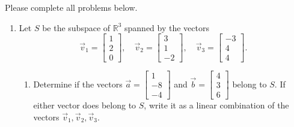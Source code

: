 \documentclass[12pt]{article}
\newcommand{\R}{\mathbb{R}}
\newcommand{\bbm}{\begin{bmatrix}}
\newcommand{\ebm}{\end{bmatrix}}
\begin{document}
\thispagestyle{fancy}
Please complete all problems below.
 \begin{enumerate}
  \item Let $S$ be the subspace of $\R^3$ spanned by the vectors
\[
 \vec{v}_1 = \bbm 1\\2\\0\ebm, \quad \vec{v}_2 = \bbm 3\\1\\-2\ebm, \quad \vec{v}_3 = \bbm -3\\4\\4\ebm.
\]
\begin{enumerate}
 \item Determine if the vectors $\vec{a} = \bbm 1\\-8\\-4\ebm$ and $\vec{b}= \bbm 4\\3\\6\ebm$ belong to $S$. If either vector does belong to $S$, write it as a linear combination of the vectors $\vec{v}_1, \vec{v}_2, \vec{v}_3$.

 \bigskip


\end{enumerate}
\end{enumerate}
\end{document}
